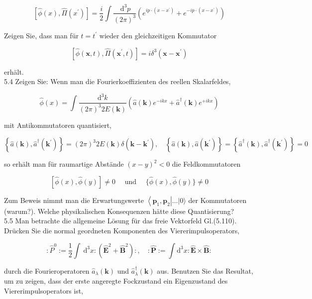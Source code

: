 \documentclass[10pt, letterpaper]{article}
\begin{document}
$$
\left[\hat{\phi}(x), \hat{\Pi}\left(x^{\prime}\right)\right]=\frac{i}{2} \int \frac{\mathrm{~d}^{3} p}{(2 \pi)^{3}}\left(e^{i p \cdot\left(x-x^{\prime}\right)}+e^{-i p \cdot\left(x-x^{\prime}\right)}\right)
$$

Zeigen Sie, dass man für $t=t^{\prime}$ wieder den gleichzeitigen Kommutator

$$
\left[\hat{\phi}(\mathbf{x}, t), \hat{\Pi}\left(\mathbf{x}^{\prime}, t\right)\right]=i \delta^{3}\left(\mathbf{x}-\mathbf{x}^{\prime}\right)
$$

erhält.\\
5.4 Zeigen Sie: Wenn man die Fourierkoeffizienten des reellen Skalarfeldes,

$$
\hat{\phi}(x)=\int \frac{\mathrm{d}^{3} k}{(2 \pi)^{3} 2 E(\mathbf{k})}\left(\hat{a}(\mathbf{k}) e^{-i k x}+\hat{a}^{\dagger}(\mathbf{k}) e^{+i k x}\right)
$$

mit Antikommutatoren quantisiert,

$$
\left\{\hat{a}(\mathbf{k}), \hat{a}^{\dagger}\left(\mathbf{k}^{\prime}\right)\right\}=(2 \pi)^{3} 2 E(\mathbf{k}) \delta\left(\mathbf{k}-\mathbf{k}^{\prime}\right), \quad\left\{\hat{a}(\mathbf{k}), \hat{a}\left(\mathbf{k}^{\prime}\right)\right\}=\left\{\hat{a}^{\dagger}(\mathbf{k}), \hat{a}^{\dagger}\left(\mathbf{k}^{\prime}\right)\right\}=0
$$

so erhält man für raumartige Abstände $(x-y)^{2}<0$ die Feldkommutatoren

$$
[\hat{\phi}(x), \hat{\phi}(y)] \neq 0 \quad \text { und } \quad\{\hat{\phi}(x), \hat{\phi}(y)\} \neq 0
$$

Zum Beweis nimmt man die Erwartungswerte $\left\langle\mathbf{p}_{1}, \mathbf{p}_{2}\right| \ldots|0\rangle$ der Kommutatoren (warum?). Welche physikalischen Konsequenzen hätte diese Quantisierung?\\
5.5 Man betrachte die allgemeine Lösung für das freie Vektorfeld Gl.(5.110). Drücken Sie die normal geordneten Komponenten des Viererimpulsoperators,

$$
: \hat{P}^{0}:=\frac{1}{2} \int \mathrm{~d}^{3} x:\left(\hat{\mathbf{E}}^{2}+\hat{\mathbf{B}}^{2}\right):, \quad: \hat{\mathbf{P}}:=\int \mathrm{d}^{3} x: \hat{\mathbf{E}} \times \hat{\mathbf{B}}:
$$

durch die Fourieroperatoren $\hat{a}_{\lambda}(\mathbf{k})$ und $\hat{a}_{\lambda}^{\dagger}(\mathbf{k})$ aus. Benutzen Sie das Resultat, um zu zeigen, dass der erste angeregte Fockzustand ein Eigenzustand des Viererimpulsoperators ist,
\end{document}
